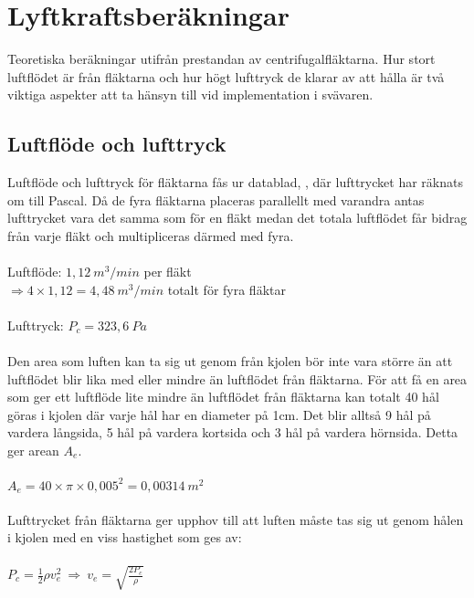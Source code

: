 \section{Lyftkraftsberäkningar}
Teoretiska beräkningar utifrån prestandan av centrifugalfläktarna. Hur stort
luftflödet är från fläktarna och hur högt lufttryck de klarar av att hålla är
två viktiga aspekter att ta hänsyn till vid implementation i svävaren.

\subsection{Luftflöde och lufttryck}
Luftflöde och lufttryck för fläktarna fås ur datablad,
\cite{Delta_BFB1212VH-R00}, där lufttrycket har räknats om till Pascal. Då de
fyra fläktarna placeras parallellt med varandra antas lufttrycket vara det samma
som för en fläkt medan det totala luftflödet får bidrag från varje fläkt och
multipliceras därmed med fyra. \\ \\
Luftflöde: $1,12\ m^3/min$ per fläkt \\
\begin{math}
\Rightarrow 4\times1,12=4,48\ m^3/min
\end{math} totalt för fyra fläktar \\ \\
Lufttryck: $P_{c}=323,6\ Pa$ \\ \\
Den area som luften kan ta sig ut genom från kjolen bör inte vara större än att
luftflödet blir lika med eller mindre än luftflödet från fläktarna. För att få
en area som ger ett luftflöde lite mindre än luftflödet från fläktarna kan
totalt 40 hål göras i kjolen där varje hål har en diameter på 1cm. Det blir
alltså 9 hål på vardera långsida, 5 hål på vardera kortsida och 3 hål på vardera
hörnsida. Detta ger arean $ A_{e}$. \\ \\
\begin{math}
A_{e}=40\times\pi\times0,005^2=0,00314\ m^2
\end{math} \\ \\
Lufttrycket från fläktarna ger upphov till att luften måste tas sig ut genom
hålen i kjolen med en viss hastighet som ges av: \\ \\
\begin{math}
P_{c}=\frac{1}{2} \rho v_{e}^2\ \Rightarrow\ v_{e}=\sqrt{\frac{2P_{c}}{\rho}}
\end{math} \\ \\
